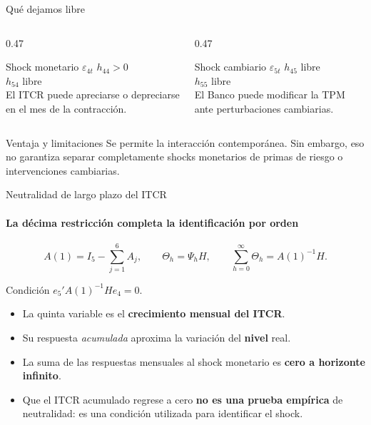 \documentclass{beamer}
\begin{document}
\begin{frame}{Qué dejamos libre}
 \begin{columns}[c]
  \begin{column}{0.47\textwidth}
   \begin{block}{Shock monetario $\varepsilon_{4t}$}
    \centering
    \large $h_{44}>0$\\[0.45em]
    \normalsize $h_{54}$ libre\\[0.45em]
    \small El ITCR puede apreciarse o depreciarse en el mes de la contracción.
   \end{block}
  \end{column}
  \begin{column}{0.47\textwidth}
   \begin{block}{Shock cambiario $\varepsilon_{5t}$}
    \centering
    \large $h_{45}$ libre\\[0.45em]
    \normalsize $h_{55}$ libre\\[0.45em]
    \small El Banco puede modificar la TPM ante perturbaciones cambiarias.
   \end{block}
  \end{column}
 \end{columns}
 \vfill
 \begin{alertblock}{Ventaja y limitaciones}
  \small Se permite la interacción contemporánea. Sin embargo, eso no garantiza
  separar completamente shocks monetarios de primas de riesgo o intervenciones cambiarias.
 \end{alertblock}
\end{frame}

\begin{frame}{Neutralidad de largo plazo del ITCR}
 \framesubtitle{La décima restricción completa la identificación por orden}
 \small
 \begin{equation*}
 A(1)=I_5-\sum_{j=1}^{6}A_j,\qquad
 \Theta_h=\Psi_hH,\qquad
 \sum_{h=0}^{\infty}\Theta_h=A(1)^{-1}H.
 \end{equation*}
 \vspace{0.1cm}
 \begin{alertblock}{Condición}
 \centering
 \Large $\displaystyle \boxed{e_5' A(1)^{-1} H e_4=0.}$
 \end{alertblock}
 \begin{itemize}
  \item La quinta variable es el \textbf{crecimiento mensual del ITCR}.
  \item Su respuesta \emph{acumulada} aproxima la variación del \textbf{nivel} real.
  \item La suma de las respuestas mensuales al shock monetario es \textbf{cero a horizonte infinito}.
  \item Que el ITCR acumulado regrese a cero \textbf{no es una prueba empírica}
  de neutralidad: es una condición utilizada para identificar el shock.
 \end{itemize}
\end{frame}
\end{document}
